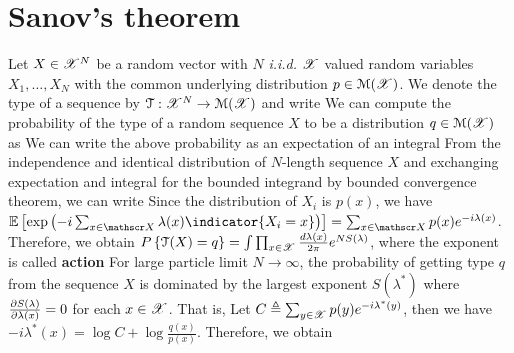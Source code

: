 \documentclass[letterpaper,english,10pt]{article}
\begin{document}
\section{Sanov's theorem}
Let $X \in \mathscr{X}^N$ be a random vector with $N$ \emph{i.i.d.} $\mathscr{X}$ valued random variables $X_1, \dots, X_N$ with the common underlying distribution $p \in \mathcal{M}(\mathscr{X})$.  
We denote the type of a sequence by $\mathcal{T} : \mathscr{X}^N \to \mathcal{M}(\mathscr{X})$ and write
We can compute the probability of the type of a random sequence $X$ to be a distribution $q \in \mathcal{M}(\mathscr{X})$ as 
We can write the above probability as an expectation of an integral
From the independence and identical distribution of $N$-length sequence $X$ and exchanging expectation and integral for the bounded integrand by bounded convergence theorem, we can write 
Since the distribution of $X_i$ is $p(x)$, we have $\E\left[\exp\left(-i\sum_{x \in \sX}\lambda(x) \indicator{X_i = x}\right)\right] = \sum_{x \in \sX}p(x)e^{-i\lambda(x)}$.  
Therefore, we obtain $P\left\{\mathcal{T}(X) = q\right\} =\int\prod_{x \in \mathscr{X}}\frac{d\lambda(x)}{2\pi}e^{NS(\lambda)}$, 
where the exponent is called \textbf{action}
For large particle limit $N \to \infty$, the probability of getting type $q$ from the sequence $X$ is dominated by the largest exponent $S(\lambda^\ast)$ where $\frac{\partial S(\lambda) }{\partial \lambda(x)} = 0$ for each $x \in \mathscr{X}$. 
That is, 
Let $C \triangleq \sum_{y \in \mathscr{X}}p(y)e^{-i\lambda^\ast(y)}$, then we have $-i\lambda^\ast(x) = \log C + \log\frac{q(x)}{p(x)}$. 
Therefore, we obtain 
\appendix
\end{document}
